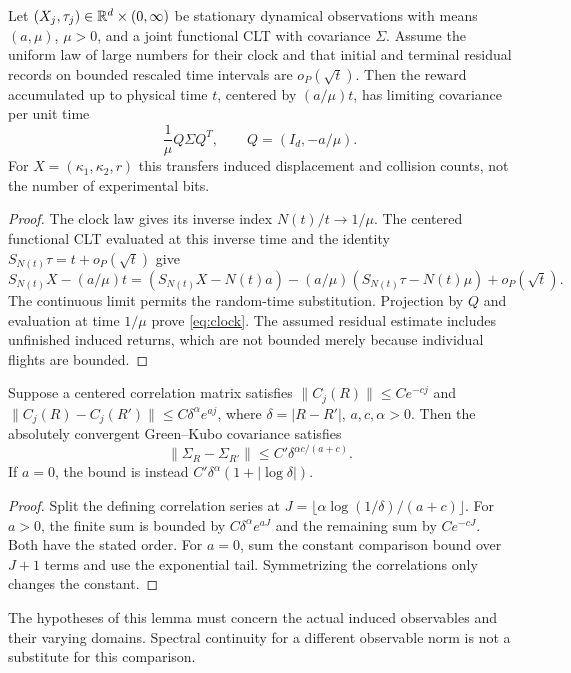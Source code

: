 \begin{proposition}\label{prop:clock}
Let $(X_j,\tau_j)\in\mathbb R^d\times(0,\infty)$ be stationary dynamical observations with means $(a,\mu)$, $\mu>0$, and a joint functional CLT with covariance $\Sigma$. Assume the uniform law of large numbers for their clock and that initial and terminal residual records on bounded rescaled time intervals are $o_P(\sqrt t)$. Then the reward accumulated up to physical time $t$, centered by $(a/\mu)t$, has limiting covariance per unit time
\begin{equation}\label{eq:clock}
 \frac1\mu Q\Sigma Q^T,\qquad Q=(I_d,-a/\mu).
\end{equation}
For $X=(\kappa_1,\kappa_2,r)$ this transfers induced displacement and collision counts, not the number of experimental bits.
\end{proposition}
\begin{proof}
The clock law gives its inverse index $N(t)/t\to1/\mu$. The centered functional CLT evaluated at this inverse time and the identity $S_{N(t)}\tau=t+o_P(\sqrt t)$ give
\[
 S_{N(t)}X-(a/\mu)t
 = (S_{N(t)}X-N(t)a)-(a/\mu)(S_{N(t)}\tau-N(t)\mu)+o_P(\sqrt t).
\]
The continuous limit permits the random-time substitution. Projection by $Q$ and evaluation at time $1/\mu$ prove \eqref{eq:clock}. The assumed residual estimate includes unfinished induced returns, which are not bounded merely because individual flights are bounded.
\end{proof}

\begin{lemma}\label{lem:covariance}
Suppose a centered correlation matrix satisfies $\|C_j(R)\|\le Ce^{-cj}$ and
$\|C_j(R)-C_j(R')\|\le C\delta^\alpha e^{a j}$, where $\delta=|R-R'|$, $a,c,\alpha>0$. Then the absolutely convergent Green--Kubo covariance satisfies
\[
 \|\Sigma_R-\Sigma_{R'}\|\le C'\delta^{\alpha c/(a+c)}.
\]
If $a=0$, the bound is instead $C'\delta^\alpha(1+|\log\delta|)$.
\end{lemma}
\begin{proof}
Split the defining correlation series at $J=\lfloor\alpha\log(1/\delta)/(a+c)\rfloor$. For $a>0$, the finite sum is bounded by $C\delta^\alpha e^{aJ}$ and the remaining sum by $Ce^{-cJ}$. Both have the stated order. For $a=0$, sum the constant comparison bound over $J+1$ terms and use the exponential tail. Symmetrizing the correlations only changes the constant.
\end{proof}
The hypotheses of this lemma must concern the actual induced observables and their varying domains. Spectral continuity for a different observable norm is not a substitute for this comparison.

